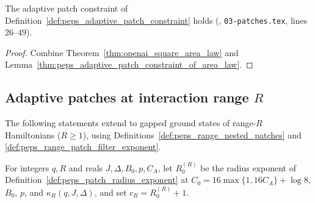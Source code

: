 \begin{theorem}
    \label{thm:peps_adaptive_patch_constraint}
    \leanok
    The adaptive patch constraint of
    Definition~\ref{def:peps_adaptive_patch_constraint} holds
    (\cite[Proposition~4.1]{OpenAI2026PolynomialPEPS}, \texttt{03-patches.tex},
    lines 26--49).
\end{theorem}

\begin{proof}
    \leanok
    Combine Theorem~\ref{thm:openai_square_area_law} and Lemma~\ref{thm:peps_adaptive_patch_constraint_of_area_law}.
\end{proof}

\subsection{Adaptive patches at interaction range \texorpdfstring{$R$}{R}}
\label{sec:peps_range_adaptive_patches}

The following statements extend
\cite[Proposition~4.1]{OpenAI2026PolynomialPEPS} to gapped ground states of
range-$R$ Hamiltonians ($R\ge1$), using
Definitions~\ref{def:peps_range_nested_patches} and
\ref{def:peps_range_patch_filter_exponent}.

\begin{definition}
    \label{def:peps_range_adaptive_patch_constants}
    \leanok
    For integers $q,R$ and reals $J,\Delta,B_0,p,C_A$, let $R_0^{(R)}$ be the
    radius exponent of Definition~\ref{def:peps_patch_radius_exponent} at
    $C_0=16\max\{1,16C_A\}+\log8$, $B_0$, $p$, and $\kappa_R(q,J,\Delta)$, and
    set $c_R=R_0^{(R)}+1$.
\end{definition}

